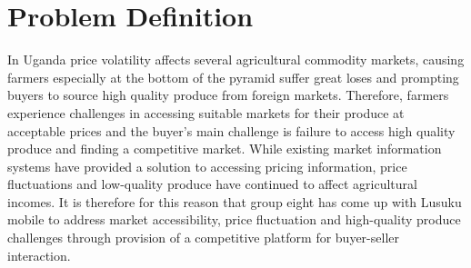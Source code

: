 \chapter{Problem Definition}

In Uganda price volatility affects several agricultural commodity markets, causing farmers especially at the bottom of the pyramid suffer great loses and prompting buyers to source high quality produce from foreign markets. Therefore, farmers experience challenges in accessing suitable markets for their produce at acceptable prices and the buyer’s main challenge is failure to access high quality produce and finding a competitive market.
While existing market information systems have provided a solution to accessing pricing information, price fluctuations and low-quality produce have continued to affect agricultural incomes.
It is therefore for this reason that group eight has come up with Lusuku mobile to address market accessibility, price fluctuation and high-quality produce challenges through provision of a competitive platform for buyer-seller interaction.
